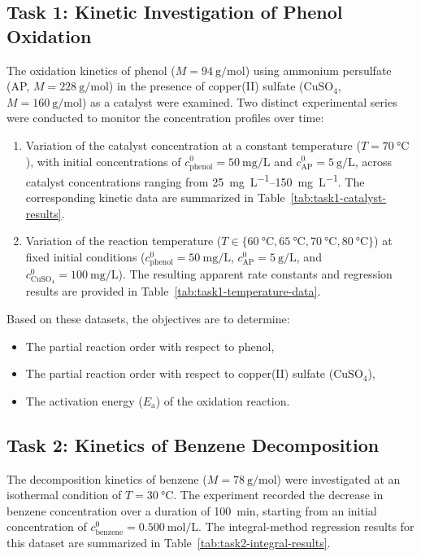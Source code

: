 \subsection{Task 1: Kinetic Investigation of Phenol Oxidation}
The oxidation kinetics of phenol ($M = \SI{94}{\gram\per\mole}$) using ammonium persulfate (AP, $M = \SI{228}{\gram\per\mole}$) in the presence of copper(II) sulfate ($\mathrm{CuSO_4}$, $M = \SI{160}{\gram\per\mole}$) as a catalyst were examined. Two distinct experimental series were conducted to monitor the concentration profiles over time:
\begin{enumerate}
    \item Variation of the catalyst concentration at a constant temperature ($T = \SI{70}{\degreeCelsius}$), with initial concentrations of $c^0_{\text{phenol}} = \SI{50}{\milli\gram\per\liter}$ and $c^0_{\text{AP}} = \SI{5}{\gram\per\liter}$, across catalyst concentrations ranging from \SIrange{25}{150}{\milli\gram\per\liter}. The corresponding kinetic data are summarized in Table~\ref{tab:task1-catalyst-results}.
    \item Variation of the reaction temperature ($T \in \{\SI{60}{\degreeCelsius}, \SI{65}{\degreeCelsius}, \SI{70}{\degreeCelsius}, \SI{80}{\degreeCelsius}\}$) at fixed initial conditions ($c^0_{\text{phenol}} = \SI{50}{\milli\gram\per\liter}$, $c^0_{\text{AP}} = \SI{5}{\gram\per\liter}$, and $c^0_{\mathrm{CuSO_4}} = \SI{100}{\milli\gram\per\liter}$). The resulting apparent rate constants and regression results are provided in Table~\ref{tab:task1-temperature-data}.
\end{enumerate}
Based on these datasets, the objectives are to determine:
\begin{itemize}
    \item The partial reaction order with respect to phenol,
    \item The partial reaction order with respect to copper(II) sulfate ($\mathrm{CuSO_4}$),
    \item The activation energy ($E_\mathrm{a}$) of the oxidation reaction.
\end{itemize}

\subsection{Task 2: Kinetics of Benzene Decomposition}
The decomposition kinetics of benzene ($M = \SI{78}{\gram\per\mole}$) were investigated at an isothermal condition of $T = \SI{30}{\degreeCelsius}$. The experiment recorded the decrease in benzene concentration over a duration of \SI{100}{\minute}, starting from an initial concentration of $c^0_{\text{benzene}} = \SI{0.500}{\mole\per\liter}$. The integral-method regression results for this dataset are summarized in
Table~\ref{tab:task2-integral-results}.

